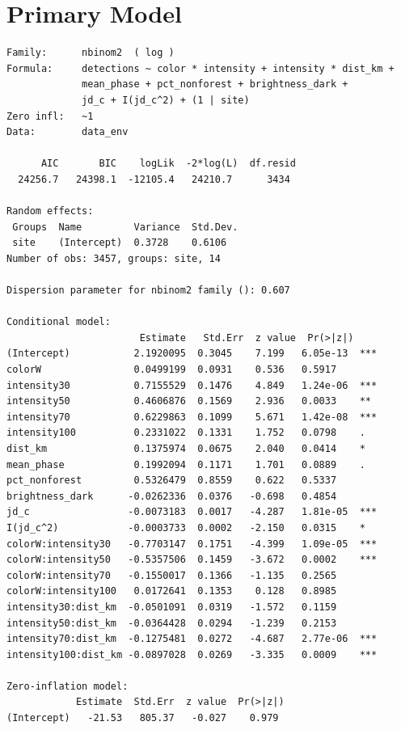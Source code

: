 \documentclass[11pt, letterpaper]{article}
\begin{document}
\section{Primary Model}

\begin{verbatim}
Family:      nbinom2  ( log )
Formula:     detections ~ color * intensity + intensity * dist_km +
             mean_phase + pct_nonforest + brightness_dark +
             jd_c + I(jd_c^2) + (1 | site)
Zero infl:   ~1
Data:        data_env

      AIC       BIC    logLik  -2*log(L)  df.resid
  24256.7   24398.1  -12105.4   24210.7      3434

Random effects:
 Groups  Name         Variance  Std.Dev.
 site    (Intercept)  0.3728    0.6106
Number of obs: 3457, groups: site, 14

Dispersion parameter for nbinom2 family (): 0.607

Conditional model:
                       Estimate   Std.Err  z value  Pr(>|z|)
(Intercept)           2.1920095  0.3045    7.199   6.05e-13  ***
colorW                0.0499199  0.0931    0.536   0.5917
intensity30           0.7155529  0.1476    4.849   1.24e-06  ***
intensity50           0.4606876  0.1569    2.936   0.0033    **
intensity70           0.6229863  0.1099    5.671   1.42e-08  ***
intensity100          0.2331022  0.1331    1.752   0.0798    .
dist_km               0.1375974  0.0675    2.040   0.0414    *
mean_phase            0.1992094  0.1171    1.701   0.0889    .
pct_nonforest         0.5326479  0.8559    0.622   0.5337
brightness_dark      -0.0262336  0.0376   -0.698   0.4854
jd_c                 -0.0073183  0.0017   -4.287   1.81e-05  ***
I(jd_c^2)            -0.0003733  0.0002   -2.150   0.0315    *
colorW:intensity30   -0.7703147  0.1751   -4.399   1.09e-05  ***
colorW:intensity50   -0.5357506  0.1459   -3.672   0.0002    ***
colorW:intensity70   -0.1550017  0.1366   -1.135   0.2565
colorW:intensity100   0.0172641  0.1353    0.128   0.8985
intensity30:dist_km  -0.0501091  0.0319   -1.572   0.1159
intensity50:dist_km  -0.0364428  0.0294   -1.239   0.2153
intensity70:dist_km  -0.1275481  0.0272   -4.687   2.77e-06  ***
intensity100:dist_km -0.0897028  0.0269   -3.335   0.0009    ***

Zero-inflation model:
            Estimate  Std.Err  z value  Pr(>|z|)
(Intercept)   -21.53   805.37   -0.027    0.979
\end{verbatim}
\end{document}
